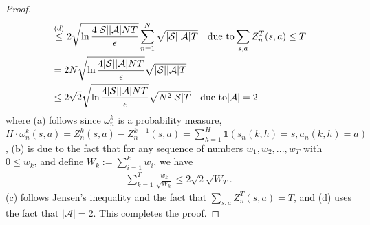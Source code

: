 \documentclass[10pt,a4paper]{amsart}
\newcommand{\cA}{\mathcal{A}}
\newcommand{\cS}{\mathcal{S}}
\begin{document}
\begin{proof}
\begin{align}
  &\overset{(d)}{\leq}  2\sqrt{\ln\frac{4|\cS||\cA|NT}{\epsilon}}\sum_{n=1}^N{ \sqrt{{|\cS||\cA|}T}}~~~\text{due to} \sum_{s,a}Z_n^T(s,a)\leq T\nonumber\allowdisplaybreaks\\
  &=  2N\sqrt{\ln\frac{4|\cS||\cA|NT}{\epsilon}}{ \sqrt{{|\cS||\cA|}T}}\nonumber\allowdisplaybreaks\\
  &\leq  2\sqrt{2}\sqrt{\ln\frac{4|\cS||\cA|NT}{\epsilon}}{ \sqrt{N^2{|\cS|}T}}~~~\text{due to} |\cA|=2\allowdisplaybreaks \label{eq:50}
\end{align}
where (a) follows since $\omega_n^k$ is a probability measure, $H\cdot\omega_n^k(s,a)=Z_n^{k}(s,a)-Z_n^{k-1}(s,a)=\sum_{h=1}^{H}\mathds{1}(s_n(k,h)=s,a_n(k,h)=a)$, (b) is due to the fact that 
for any sequence of numbers $w_1,w_2,...,w_T$ with $0\leq w_k$, and define $W_{k}:=\sum_{i=1}^k w_i$, we have
    \begin{align*}
        \sum_{k=1}^T \frac{w_k}{\sqrt{W_{k}}} \leq 2\sqrt{2} \sqrt{W_T}.
    \end{align*}
(c) follows Jensen's inequality and the fact that $\sum_{s,a}Z_n^T(s,a)=T$, and (d) uses the fact that $|\mathcal{A}|=2$. This completes the proof.
\end{proof}
\end{document}
